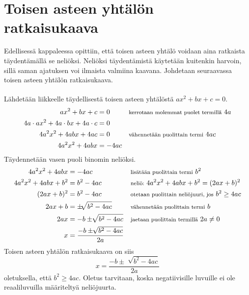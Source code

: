 \section{Toisen asteen yhtälön ratkaisukaava}


Edellisessä kappaleessa opittiin, että toisen asteen yhtälö voidaan aina ratkaista täydentämällä se neliöksi.
Neliöksi täydentämistä käytetään kuitenkin harvoin, sillä saman ajatuksen voi ilmaista valmiina kaavana.
Johdetaan seuraavassa toisen asteen yhtälön ratkaisukaava. \\ \\

Lähdetään liikkeelle täydellisestä toisen asteen yhtälöstä $ax^2+bx+c=0$.
\begin{align*}
ax^2+bx+c&=0 &&\textnormal{\footnotesize{kerrotaan molemmat puolet termillä}} \ 4a \\
4a \cdot ax^2+4a \cdot bx + 4a \cdot c&=0 \\
4a^2x^2+4abx+4ac&=0 &&\textnormal{\footnotesize{vähennetään puolittain termi}} \ 4ac  \\
4a^2x^2+4abx&=-4ac
\end{align*}
Täydennetään vasen puoli binomin neliöksi.
\begin{align*}
4a^2x^2+4abx&=-4ac &&\textnormal{\footnotesize{lisätään puolittain termi}} \ b^2 \\
4a^2x^2+4abx+b^2&=b^2-4ac &&\textnormal{\footnotesize{neliö:}} \ 4a^2x^2+4abx+b^2=(2ax+b)^2 \\
(2ax+b)^2&=b^2-4ac &&\textnormal{\footnotesize{otetaan puolittain neliöjuuri, jos}} \ b^2 \geq 4ac \\
2ax+b&= \pm \sqrt[]{b^2-4ac} &&\textnormal{\footnotesize{vähennetään puolittain termi}} \ b \\
2ax&=-b \pm \sqrt[]{b^2-4ac} &&\textnormal{\footnotesize{jaetaan puolittain termillä}} \ 2a \neq 0 \\
x&= \frac{-b \pm \sqrt[]{b^2-4ac}}{2a}
\end{align*}
Toisen asteen yhtälön ratkaisukaava on siis \[x= \frac{-b \pm \sqrt[]{b^2-4ac}}{2a}\] oletuksella, että $b^2 \geq 4ac$. Oletus tarvitaan, koska negatiivisille luvuille ei ole reaaliluvuilla määriteltyä neliöjuurta.\\
